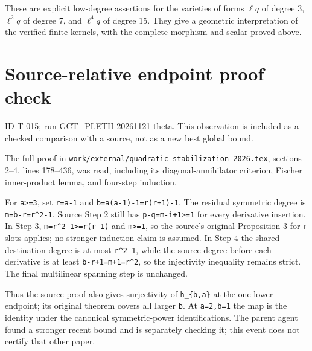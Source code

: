 \documentclass[
  10pt,
]{article}
\begin{document}
These are explicit low-degree assertions for the varieties of forms
\(\ell q\) of degree 3, \(\ell^2q\) of degree 7, and \(\ell^4q\) of
degree 15. They give a geometric interpretation of the verified finite
kernels, with the complete morphism and scalar proved above.

\section{Source-relative endpoint proof
check}\label{source-relative-endpoint-proof-check}

ID T-015; run GCT\_PLETH-20261121-theta. This observation is included as
a checked comparison with a source, not as a new best global bound.

The full proof in
\texttt{\small work/\allowbreak{}external/\allowbreak{}quadratic\_\allowbreak{}stabilization\_\allowbreak{}2026.tex},
sections 2--4, lines 178--436, was read, including its
diagonal-annihilator criterion, Fischer inner-product lemma, and
four-step induction.

For \texttt{\small a>=\allowbreak{}3}, set
\texttt{\small r=\allowbreak{}a-\allowbreak{}1} and
\texttt{\small b=\allowbreak{}a(\allowbreak{}a-\allowbreak{}1)\allowbreak{}-\allowbreak{}1=\allowbreak{}r(\allowbreak{}r+\allowbreak{}1)\allowbreak{}-\allowbreak{}1}.
The residual symmetric degree is
\texttt{\small m=\allowbreak{}b-\allowbreak{}r=\allowbreak{}r\textasciicircum{}2-\allowbreak{}1}.
Source Step 2 still has
\texttt{\small p-\allowbreak{}q=\allowbreak{}m-\allowbreak{}i+\allowbreak{}1>=\allowbreak{}1}
for every derivative insertion. In Step 3,
\texttt{\small m=\allowbreak{}r\textasciicircum{}2-\allowbreak{}1>=\allowbreak{}r(\allowbreak{}r-\allowbreak{}1)\allowbreak{}}
and \texttt{\small m>=\allowbreak{}1}, so the source's original
Proposition 3 for \texttt{\small r} slots applies; no stronger induction
claim is assumed. In Step 4 the shared destination degree is at most
\texttt{\small r\textasciicircum{}2-\allowbreak{}1}, while the source
degree before each derivative is at least
\texttt{\small b-\allowbreak{}r+\allowbreak{}1=\allowbreak{}m+\allowbreak{}1=\allowbreak{}r\textasciicircum{}2},
so the injectivity inequality remains strict. The final multilinear
spanning step is unchanged.

Thus the source proof also gives surjectivity of
\texttt{\small h\_\allowbreak{}\{b,\allowbreak{}a\}} at the one-lower
endpoint; its original theorem covers all larger \texttt{\small b}. At
\texttt{\small a=\allowbreak{}2,\allowbreak{}b=\allowbreak{}1} the map
is the identity under the canonical symmetric-power identifications. The
parent agent found a stronger recent bound and is separately checking
it; this event does not certify that other paper.
\end{document}
